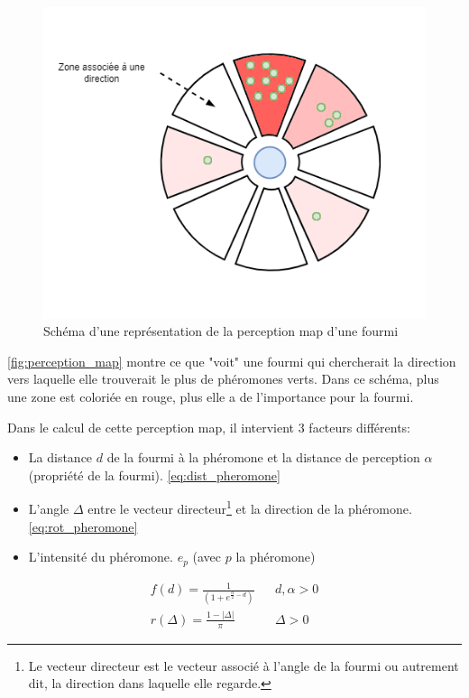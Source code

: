 \documentclass{EPUProjetDi}
\begin{document}
\begin{figure}[h]
    \centering
    \includegraphics[scale=0.5]{perceptionmap.png}
    \caption{Schéma d'une représentation de la perception map d'une fourmi}
    \label{fig:perception_map}
\end{figure}

\autoref{fig:perception_map} montre ce que "voit" une fourmi qui chercherait la direction vers laquelle elle trouverait le plus de phéromones verts.
Dans ce schéma, plus une zone est coloriée en rouge, plus elle a de l'importance pour la fourmi.

Dans le calcul de cette perception map, il intervient 3 facteurs différents:
\begin{itemize}
    \item La distance $d$ de la fourmi à la phéromone et la distance de perception $\alpha$ (propriété de la fourmi). \eqref{eq:dist_pheromone}
    \item L'angle $\Delta$ entre le vecteur directeur\footnote{Le vecteur directeur est le vecteur associé à l'angle de la fourmi ou
    autrement dit, la direction dans laquelle elle regarde.} et la direction de la phéromone. \eqref{eq:rot_pheromone}
    \item L'intensité du phéromone. $e_p$ (avec $p$ la phéromone)
\end{itemize}

\begin{subequations}
\begin{align}
    f(d)=\frac{1}{(1 + e^{\frac{\alpha}{2} - d})} && d,\alpha > 0 \label{eq:dist_pheromone}\\
    r(\Delta)= \frac{1-\left\lvert \Delta\right\rvert}{\pi} && \Delta \label{eq:rot_pheromone}> 0
\end{align}
\end{subequations}
\end{document}

